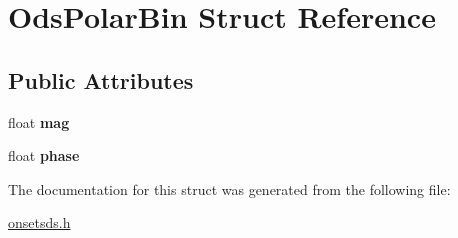 \hypertarget{structOdsPolarBin}{\section{\-Ods\-Polar\-Bin \-Struct \-Reference}
\label{structOdsPolarBin}
}
\subsection*{\-Public \-Attributes}
\begin{DoxyCompactItemize}
\item 
\hypertarget{structOdsPolarBin_ad143c1de03d9475c707aa1974031f416}{float {\bfseries mag}}\label{structOdsPolarBin_ad143c1de03d9475c707aa1974031f416}

\item 
\hypertarget{structOdsPolarBin_acf1a34d6ddf28ac6dda1c550c6385cdc}{float {\bfseries phase}}\label{structOdsPolarBin_acf1a34d6ddf28ac6dda1c550c6385cdc}

\end{DoxyCompactItemize}


\-The documentation for this struct was generated from the following file\-:\begin{DoxyCompactItemize}
\item 
\hyperlink{onsetsds_8h}{onsetsds.\-h}\end{DoxyCompactItemize}

